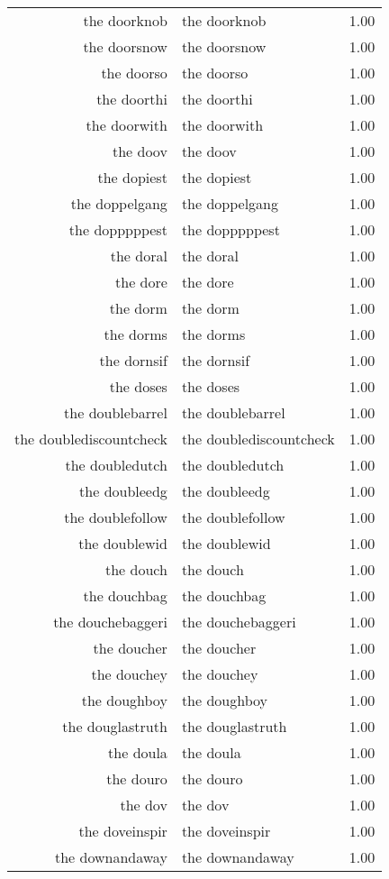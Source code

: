 \begin{table}[ht]
\begin{tabular}{rlr}
  the doorknob & the doorknob & 1.00 \\ 
  the doorsnow & the doorsnow & 1.00 \\ 
  the doorso & the doorso & 1.00 \\ 
  the doorthi & the doorthi & 1.00 \\ 
  the doorwith & the doorwith & 1.00 \\ 
  the doov & the doov & 1.00 \\ 
  the dopiest & the dopiest & 1.00 \\ 
  the doppelgang & the doppelgang & 1.00 \\ 
  the dopppppest & the dopppppest & 1.00 \\ 
  the doral & the doral & 1.00 \\ 
  the dore & the dore & 1.00 \\ 
  the dorm & the dorm & 1.00 \\ 
  the dorms & the dorms & 1.00 \\ 
  the dornsif & the dornsif & 1.00 \\ 
  the doses & the doses & 1.00 \\ 
  the doublebarrel & the doublebarrel & 1.00 \\ 
  the doublediscountcheck & the doublediscountcheck & 1.00 \\ 
  the doubledutch & the doubledutch & 1.00 \\ 
  the doubleedg & the doubleedg & 1.00 \\ 
  the doublefollow & the doublefollow & 1.00 \\ 
  the doublewid & the doublewid & 1.00 \\ 
  the douch & the douch & 1.00 \\ 
  the douchbag & the douchbag & 1.00 \\ 
  the douchebaggeri & the douchebaggeri & 1.00 \\ 
  the doucher & the doucher & 1.00 \\ 
  the douchey & the douchey & 1.00 \\ 
  the doughboy & the doughboy & 1.00 \\ 
  the douglastruth & the douglastruth & 1.00 \\ 
  the doula & the doula & 1.00 \\ 
  the douro & the douro & 1.00 \\ 
  the dov & the dov & 1.00 \\ 
  the doveinspir & the doveinspir & 1.00 \\ 
  the downandaway & the downandaway & 1.00 \\ 

\end{tabular}
\end{table}
